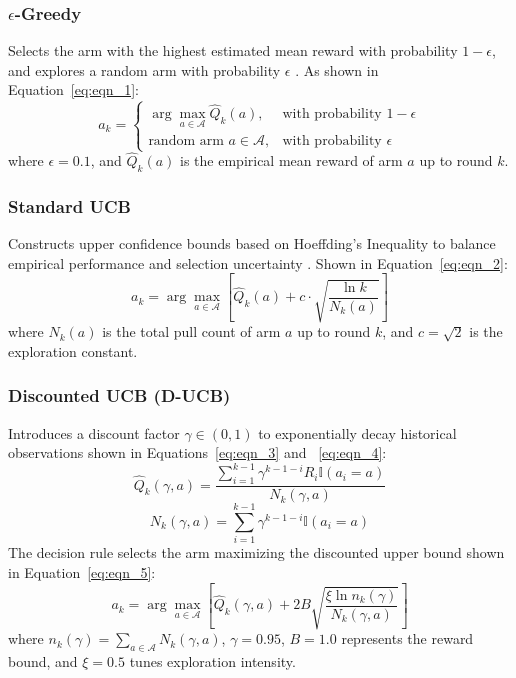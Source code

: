 \subsubsection{$\epsilon$-Greedy}
Selects the arm with the highest estimated mean reward with probability $1 - \epsilon$, and explores a random arm with probability $\epsilon$ \citep{adaptive}. As shown in Equation~\eqref{eq:eqn_1}:
\begin{equation}
\label{eq:eqn_1}
a_k = \begin{cases} 
\arg\max_{a \in \mathcal{A}} \hat{Q}_k(a), & \text{with probability } 1 - \epsilon \\
\text{random arm } a \in \mathcal{A}, & \text{with probability } \epsilon 
\end{cases}
\end{equation}
where $\epsilon = 0.1$, and $\hat{Q}_k(a)$ is the empirical mean reward of arm $a$ up to round $k$.

\subsubsection{Standard UCB}
Constructs upper confidence bounds based on Hoeffding's Inequality to balance empirical performance and selection uncertainty \citep{11041325}. Shown in Equation~\eqref{eq:eqn_2}:
\begin{equation}
\label{eq:eqn_2}
a_k = \arg\max_{a \in \mathcal{A}} \left[ \hat{Q}_k(a) + c \cdot \sqrt{\frac{\ln k}{N_k(a)}} \right]
\end{equation}
where $N_k(a)$ is the total pull count of arm $a$ up to round $k$, and $c = \sqrt{2}$ is the exploration constant.

\subsubsection{Discounted UCB (D-UCB)}
Introduces a discount factor $\gamma \in (0, 1)$ to exponentially decay historical observations \citep{DeCarvalho2025Toward, Singh2024Leveraging} shown in Equations~\eqref{eq:eqn_3} and ~\eqref{eq:eqn_4}:
\begin{equation}
\label{eq:eqn_3}
\hat{Q}_k(\gamma, a) = \frac{\sum_{i=1}^{k-1} \gamma^{k-1-i} R_i \mathbb{I}(a_i = a)}{N_k(\gamma, a)}
\end{equation}
\begin{equation}
\label{eq:eqn_4}
N_k(\gamma, a) = \sum_{i=1}^{k-1} \gamma^{k-1-i} \mathbb{I}(a_i = a)
\end{equation}
The decision rule selects the arm maximizing the discounted upper bound shown in Equation~\eqref{eq:eqn_5}:
\begin{equation}
\label{eq:eqn_5}
a_k = \arg\max_{a \in \mathcal{A}} \left[ \hat{Q}_k(\gamma, a) + 2 B \sqrt{\frac{\xi \ln n_k(\gamma)}{N_k(\gamma, a)}} \right]
\end{equation}
where $n_k(\gamma) = \sum_{a \in \mathcal{A}} N_k(\gamma, a)$, $\gamma = 0.95$, $B = 1.0$ represents the reward bound, and $\xi = 0.5$ tunes exploration intensity.

